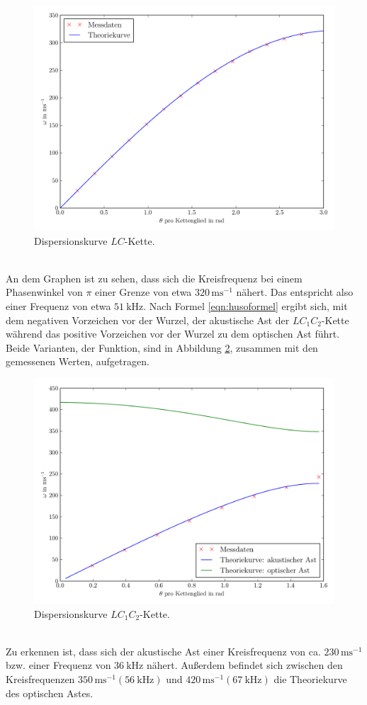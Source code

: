 \documentclass[
  bibliography=totoc,     %
  captions=tableheading,  %
  titlepage=firstiscover, %
]{scrartcl}
\begin{document}
\begin{figure}
  \centering
  \includegraphics[width=\textwidth]{Plot3.pdf}
  \caption{Dispersionskurve $LC$-Kette.}
  \label{fig:plot}
\end{figure}\\
An dem Graphen ist zu sehen, dass sich die Kreisfrequenz bei einem Phasenwinkel
von $\pi$ einer Grenze von etwa $320\,\si{\milli\second\tothe{-1}}$ nähert. Das entspricht
also einer Frequenz von etwa $\SI{51}{\kilo\hertz}$.
\clearpage
Nach Formel \eqref{eqn:husoformel} ergibt sich, mit dem negativen Vorzeichen vor der Wurzel, der
akustische Ast der $LC_1C_2$-Kette während das positive Vorzeichen vor der Wurzel
zu dem optischen Ast führt.
Beide Varianten, der Funktion, sind in Abbildung \ref{fig:plot2}, zusammen mit den gemessenen
Werten, aufgetragen.
\begin{figure}
  \centering
  \includegraphics[width=\textwidth]{Plot4.pdf}
  \caption{Dispersionskurve $LC_1C_2$-Kette.}
  \label{fig:plot2}
\end{figure}\\
Zu erkennen ist, dass sich der akustische Ast einer Kreisfrequenz von ca. $230\,\si{\milli\second\tothe{-1}}$
bzw. einer Frequenz von $\SI{36}{\kilo\hertz}$ nähert.
Außerdem befindet sich zwischen den Kreisfrequenzen $350\,\si{\milli\second\tothe{-1}} \left( \SI{56}{\kilo\hertz} \right)$
und $420\,\si{\milli\second\tothe{-1}} \left( \SI{67}{\kilo\hertz} \right)$ die Theoriekurve
des optischen Astes.
\clearpage
\end{document}
